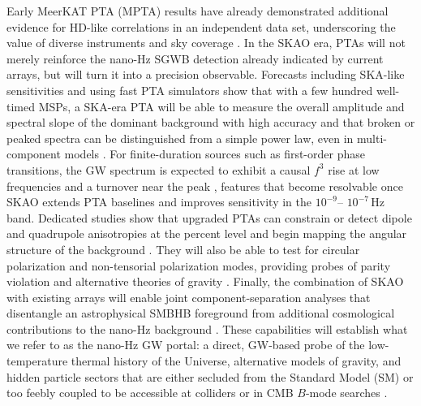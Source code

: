 \documentclass[a4paper,11pt]{article}
\begin{document}
Early MeerKAT PTA (MPTA) results have already demonstrated additional evidence for HD-like
correlations in an independent data set, underscoring the value of diverse instruments and sky 
coverage \citep{Miles:2025MPTA}. In the SKAO era, PTAs will not merely reinforce the nano-Hz SGWB
detection already indicated by current arrays, but will turn it into a precision observable. 
Forecasts including SKA-like sensitivities and using fast PTA simulators show that with 
a few hundred well-timed MSPs, a SKA-era PTA will be able to measure the overall amplitude 
and spectral slope of the dominant background with high accuracy and that broken or peaked spectra 
can be distinguished from a simple power law, even in multi-component models
\citep{Babak:2024fastPTA,Lamb:2023Rapid,Gersbach:2025SpatialSpectral}. For finite-duration sources
such as first-order phase transitions, the GW spectrum is expected to exhibit a causal $f^{3}$ rise 
at low frequencies and a turnover near the peak \citep{Caprini:2018csg,Hindmarsh:2017}, features that
become resolvable once SKAO extends PTA baselines and improves sensitivity in the $10^{-9}$–
$10^{-7}\,\mathrm{Hz}$ band. Dedicated studies show that upgraded PTAs can constrain or detect dipole
and quadrupole anisotropies at the percent level and begin mapping the angular structure of the
background \citep{Pol:2022Anisotropy,Depta:2024Anisotropy}. They will also be able to test for
circular polarization and non-tensorial polarization modes, providing probes of parity violation 
and alternative theories of gravity
\citep{SatoPolito:2022CircPol,JimenezCruz:2024CircPol,Lee:2008NonEinsteinian,Chamberlin:2012AltPol,
Cornish:2018AltGravity}. Finally, the combination of SKAO with existing arrays will enable joint
component-separation analyses that disentangle an astrophysical SMBHB foreground from additional
cosmological contributions to the nano-Hz background
\citep{Babak:2024fastPTA,Lamb:2023Rapid,Gersbach:2025SpatialSpectral}. These capabilities will
establish what we refer to as the nano-Hz GW portal: a direct, GW-based probe of the low-temperature
thermal history of the Universe, alternative models of gravity, and hidden particle sectors that are
either secluded from the Standard Model (SM) or too feebly coupled to be accessible at 
colliders or in CMB $B$-mode searches 
\citep{BurkeSpolaor:2019CQG,Taylor:2025SKAReview,Caldwell:2022DEUGW,Bian:2025GWcosmology,
Roshan:2025FirstSecond}.
\end{document}
